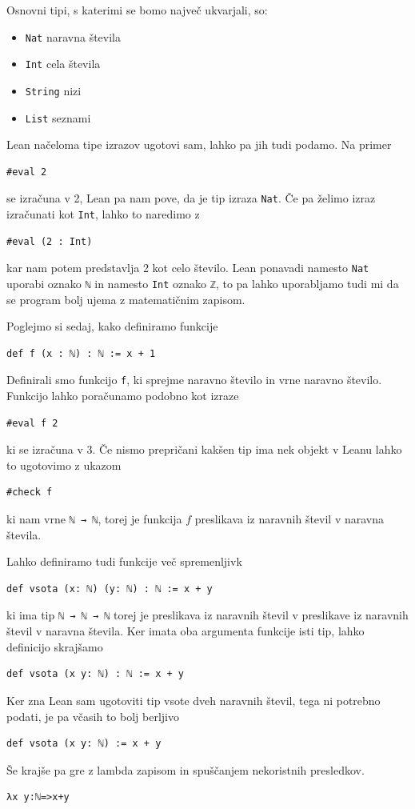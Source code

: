 \documentclass[mat1]{fmfdelo}
\begin{document}
Osnovni tipi, s katerimi se bomo največ ukvarjali, so:
\begin{itemize}
    \item \lstinline{Nat} naravna števila
    \item \lstinline{Int} cela števila
    \item \lstinline{String} nizi
    \item \lstinline{List} seznami
\end{itemize}
Lean načeloma tipe izrazov ugotovi sam, lahko pa jih tudi podamo. Na primer
\begin{lstlisting}
#eval 2
\end{lstlisting}
se izračuna v 2, Lean pa nam pove, da je tip izraza \lstinline{Nat}. Če pa želimo izraz izračunati kot \lstinline{Int}, lahko to naredimo z
\begin{lstlisting}
#eval (2 : Int)
\end{lstlisting}
kar nam potem predstavlja 2 kot celo število. Lean ponavadi namesto
\lstinline{Nat} uporabi oznako \lstinline{ℕ} in namesto \lstinline{Int} oznako \lstinline{ℤ}, to pa lahko uporabljamo tudi mi
da se program bolj ujema z matematičnim zapisom. 

Poglejmo si sedaj, kako definiramo funkcije
\begin{lstlisting}
def f (x : ℕ) : ℕ := x + 1
\end{lstlisting}
Definirali smo funkcijo \lstinline{f}, ki sprejme naravno število in vrne naravno število. Funkcijo lahko poračunamo podobno kot izraze
\begin{lstlisting}
#eval f 2
\end{lstlisting}
ki se izračuna v 3. Če nismo prepričani kakšen tip ima nek objekt v Leanu lahko to ugotovimo z ukazom
\begin{lstlisting}
#check f
\end{lstlisting}
ki nam vrne \lstinline{ℕ → ℕ}, torej je funkcija $f$ preslikava iz naravnih števil v naravna števila.

Lahko definiramo tudi funkcije več spremenljivk
\begin{lstlisting}
def vsota (x: ℕ) (y: ℕ) : ℕ := x + y
\end{lstlisting}
ki ima tip \lstinline{ℕ → ℕ → ℕ} torej je preslikava iz naravnih števil v preslikave iz naravnih števil v naravna števila.
Ker imata oba argumenta funkcije isti tip, lahko definicijo skrajšamo
\begin{lstlisting}
def vsota (x y: ℕ) : ℕ := x + y
\end{lstlisting}
Ker zna Lean sam ugotoviti tip vsote dveh naravnih števil, tega ni potrebno podati, je pa včasih to bolj berljivo
\begin{lstlisting}
def vsota (x y: ℕ) := x + y
\end{lstlisting}
Še krajše pa gre z lambda zapisom in spuščanjem nekoristnih presledkov.
\begin{lstlisting}
λx y:ℕ=>x+y
\end{lstlisting}
\end{document}
